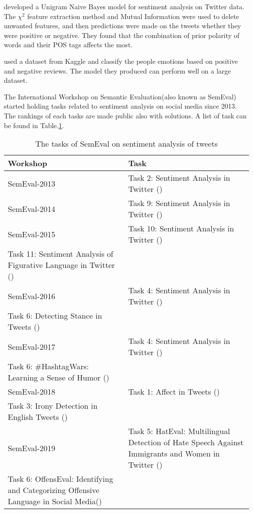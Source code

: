 \cite{opinionMiningLiang2013} developed a Unigram Naive Bayes model for
sentiment analysis on Twitter data. The $\chi^2$ feature extraction method
and Mutual Information were used to delete unwanted features, and then predictions
were made on the tweets whether they were positive or negative. They found that
the combination of prior polarity of words and their POS tags affects the most.

\cite{bhavsar2019sentiment} used a dataset from Kaggle and classify the people
emotions based on positive and negative reviews. The model they produced can
perform well on a large dataset.

The International Workshop on Semantic Evaluation(also known as SemEval)
started holding tasks related to sentiment analysis on social media since 2013.
The rankings of each tasks are made public also with solutions. A list of task
can be found in Table.\ref{table:SemEvalTasks}. %


\begin{table}[h]
  \caption{The tasks of SemEval on sentiment analysis of tweets}
  \label{table:SemEvalTasks}
  \centering
  \renewcommand{\tabularxcolumn}{m} %
  \begin{tabularx}{\textwidth}{l >{\raggedright}X}
    \toprule
    \textbf{Workshop} & \textbf{Task}
    \tabularnewline \midrule
    SemEval-2013
    &
    Task 2: Sentiment Analysis in Twitter (\cite{SemEval2013Task2})
    \tabularnewline \hline
    SemEval-2014
    &
    Task 9: Sentiment Analysis in Twitter (\cite{SemEval2014Task9})
    \tabularnewline \hline
    SemEval-2015
    &
    Task 10: Sentiment Analysis in Twitter (\cite{SemEval2015Task10})\\
    Task 11: Sentiment Analysis of Figurative Language in Twitter
    (\cite{SemEval2015Task11})
    \tabularnewline \hline
    SemEval-2016
    &
    Task 4: Sentiment Analysis in Twitter (\cite{SemEval2016Task4})\\
    Task 6: Detecting Stance in Tweets (\cite{SemEval2016Task6})
    \tabularnewline \hline
    SemEval-2017
    &
    Task 4: Sentiment Analysis in Twitter (\cite{SemEval2017Task4})\\
    Task 6: \#HashtagWars: Learning a Sense of Humor (\cite{SemEval2017Task6})
    \tabularnewline \hline
    SemEval-2018
    &
    Task 1: Affect in Tweets (\cite{SemEval2018Task1})\\
    Task 3: Irony Detection in English Tweets (\cite{SemEval2018Task3})
    \tabularnewline \hline
    SemEval-2019
    &
    Task 5: HatEval: Multilingual Detection of Hate Speech Against Immigrants
    and Women in Twitter (\cite{SemEval2019Task5})\\
    Task 6: OffensEval: Identifying and Categorizing Offensive Language in
    Social Media(\cite{SemEval2019Task6})
    \tabularnewline \bottomrule
  \end{tabularx}
\end{table}
